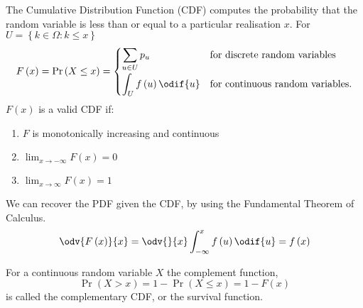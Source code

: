 \documentclass{article}
\begin{document}
\begin{definition}
    The Cumulative Distribution Function (CDF) computes the probability that the random variable is
    less than or equal to a particular realisation \(x\). For \(U = \left\{ k \in \Omega : k \leq x \right\}\)
    \begin{equation*}
        F\left( x \right) = \Pr{\left( X \leq x \right)} =
        \begin{cases}
            \displaystyle \sum_{u \in U} p_u                  & \text{for discrete random variables}    \\[0.4cm]
            \displaystyle \int_{U} f\left( u \right) \odif{u} & \text{for continuous random variables}.
        \end{cases}
    \end{equation*}
    \(F\left( x \right)\) is a valid CDF if:
    \begin{enumerate}
        \item \(F\) is monotonically increasing and continuous
        \item \(\lim_{x \to -\infty} F\left( x \right) = 0\)
        \item \(\lim_{x \to \infty} F\left( x \right) = 1\)
    \end{enumerate}
    We can recover the PDF given the CDF, by using the Fundamental Theorem of Calculus.
    \begin{equation*}
        \odv{F\left( x \right)}{x} = \odv{}{x} \int_{-\infty}^x f\left( u \right) \odif{u} = f\left( x \right)
    \end{equation*}
\end{definition}
\begin{definition}
    For a continuous random variable \(X\) the complement function,
    \begin{equation*}
        \Pr{\left( X > x \right)} = 1 - \Pr{\left( X \leq x \right)} = 1 - F\left( x \right)
    \end{equation*}
    is called the complementary CDF, or the survival function.
\end{definition}
\end{document}
